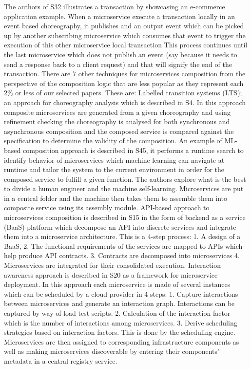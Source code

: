 \documentclass{article}
\begin{document}
\begin{multicols}{2}
The authors of S32 illustrates a transaction by showcasing an  e-commerce application example. When a microservice execute a transaction locally in an event based choreography, it publishes and an output event which can be picked up by another subscribing microservice which consumes that event to trigger the execution of this other microservice local transaction This process continues until the last microservice which does not publish an event (say because it needs to send a response back to a client request) and that will signify the end of the transaction. There are 7 other techniques for microservices composition from the perspective of the composition logic that are less popular as they represent each 2\% or less of our selected papers. These are: Labelled transition systems (LTS); an approach for choreography analysis which is described in S4. In this approach composite microservices are generated from a given choreography and using refinement checking the choreography is analysed for both synchronous and asynchronous composition and the composed service is compared against the specification to determine the validity of the composition.
An example of ML-based composition approach is described in S45, it performs a runtime search to identify behavior of microservices which machine learning can navigate at runtime and tailor the system to the current environment in order for the composed service to fulfill a given function. The authors explore what is the best to divide a human engineer and the machine self-learning. Microservices are put in a central folder and the machine then takes them to assemble them into composite service using its assembly module. 
API-based approach to microservices composition is described in S15 in the form of backend as a service (BaaS) platform which decompose an API into discrete services and integrate them into a microservice architecture. This is a 4-step process: 1. A design of a BaaS, 2. The functional requirements of the services are mapped to APIs which help produce API contracts. 3. Contracts are decomposed into microservices 4. Microservices are integrated for their consolidated execution. 
Interaction awareness approach is described in S20 as a framework for microservice deployment. In this approach each microservice is made of several instances which can be scheduled by a cloud provider in 4 steps: 1. Capture interactions between microservices and generate an interaction graph. Interactions can be captured by way of load test scripts.
2. Calculation of the interaction factor which is the number of interactions among microservices. 3. Derive scheduling strategies based on interaction factors. This is done by the scheduling engine. Microservices are then assigned to corresponding infrastructure components as well as making microservices discoverable by entering their components’ metadata in a central registry service. 

\end{multicols}
\end{document}
